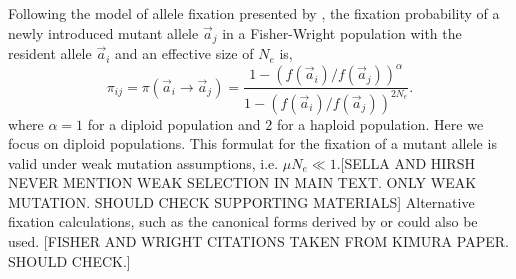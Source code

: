 \documentclass[13pt]{article}
\newcommand{\avec}{\ensuremath{\vec{a}}\xspace}
\begin{document}
Following the model of allele fixation presented by \citet{SellaAndHirsh05}, the fixation probability of a newly introduced mutant allele $\avec_j$ in a Fisher-Wright population with the resident allele $\avec_i$ and an effective size of $N_e$ is,
\begin{equation}
\pi_{ij} = \pi\left(\avec_i \to \avec_j \right) = \frac{1-\left(f\left(\avec_i\right)/f\left(\avec_j\right)\right)^\alpha}{1-\left(f\left(\avec_i\right)/f\left(\avec_j\right)\right)^{2N_e}}.
\label{eq:fixation}
\end{equation}
where $\alpha = 1$ for a diploid population and $2$ for a haploid population.
Here we focus on diploid populations.
This formulat for the fixation of a mutant allele is valid under weak mutation assumptions, i.e. $\mu N_e \ll 1$.[SELLA AND HIRSH NEVER MENTION WEAK SELECTION IN MAIN TEXT. ONLY WEAK MUTATION. SHOULD CHECK SUPPORTING MATERIALS] %
Alternative fixation calculations, such as the canonical forms derived by \citet{Fisher30, Wright31} or \citet{Kimura62} could also be used. [FISHER AND WRIGHT CITATIONS TAKEN FROM KIMURA PAPER. SHOULD CHECK.] 

%
%
\end{document}
